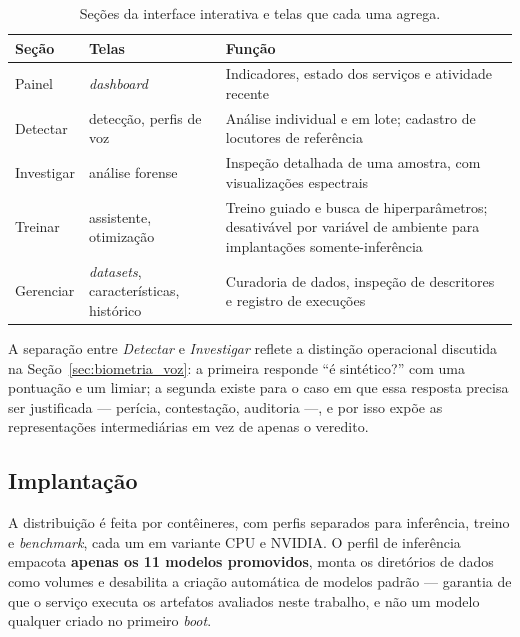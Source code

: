 \documentclass[12pt,a4paper]{article}
\begin{document}
\begin{table}[H]
	\centering
	\caption{Seções da interface interativa e telas que cada uma agrega.}
	\label{tab:secoes_interface}
	\small
	\begin{tabular}{@{}>{\raggedright\arraybackslash}p{2.9cm}
			>{\raggedright\arraybackslash}p{4.0cm}
			>{\raggedright\arraybackslash}p{7.4cm}@{}}
		\toprule
		\textbf{Seção} & \textbf{Telas} & \textbf{Função} \\
		\midrule
		Painel & \textit{dashboard} & Indicadores, estado dos serviços e atividade recente \\
		\addlinespace
		Detectar & detecção, perfis de voz & Análise individual e em lote; cadastro de locutores de referência \\
		\addlinespace
		Investigar & análise forense & Inspeção detalhada de uma amostra, com visualizações espectrais \\
		\addlinespace
		Treinar & assistente, otimização & Treino guiado e busca de hiperparâmetros; desativável por variável de ambiente para implantações somente-inferência \\
		\addlinespace
		Gerenciar & \textit{datasets}, características, histórico & Curadoria de dados, inspeção de descritores e registro de execuções \\
		\bottomrule
	\end{tabular}
\end{table}

A separação entre \emph{Detectar} e \emph{Investigar} reflete a distinção
operacional discutida na Seção~\ref{sec:biometria_voz}: a primeira responde
``é sintético?'' com uma pontuação e um limiar; a segunda existe para o caso em
que essa resposta precisa ser justificada --- perícia, contestação, auditoria
---, e por isso expõe as representações intermediárias em vez de apenas o
veredito.

\subsection{Implantação}

A distribuição é feita por contêineres, com perfis separados para inferência,
treino e \textit{benchmark}, cada um em variante CPU e NVIDIA. O perfil de
inferência empacota \textbf{apenas os \num{11} modelos promovidos}, monta os
diretórios de dados como volumes e desabilita a criação automática de modelos
padrão --- garantia de que o serviço executa os artefatos avaliados neste
trabalho, e não um modelo qualquer criado no primeiro \textit{boot}.
\end{document}
